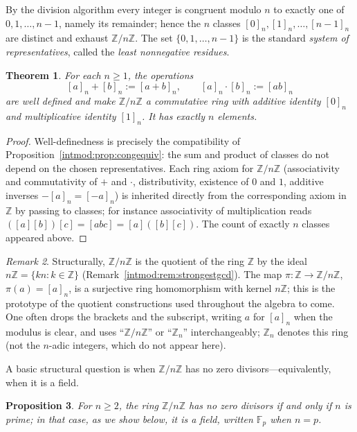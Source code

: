 \documentclass[11pt,a4paper]{article}
\newtheorem{theorem}{Theorem}[section]
\newtheorem{proposition}[theorem]{Proposition}
\theoremstyle{definition}
\theoremstyle{remark}
\newtheorem{remark}[theorem]{Remark}
\newcommand{\Z}{\ensuremath{\mathbb{Z}}}
\newcommand{\Fp}{\ensuremath{\mathbb{F}_{p}}}
\begin{document}
By the division algorithm every integer is congruent modulo \(n\) to exactly one of \(0,1,\dots,n-1\), namely its remainder; hence the \(n\) classes \([0]_n,[1]_n,\dots,[n-1]_n\) are distinct and exhaust \(\Z/n\Z\). The set \(\{0,1,\dots,n-1\}\) is the standard \emph{system of representatives}, called the \emph{least nonnegative residues}.

\begin{theorem}\label{intmod:thm:znring}
For each \(n\ge 1\), the operations
\[
[a]_n + [b]_n := [a+b]_n, \qquad [a]_n\cdot[b]_n := [ab]_n
\]
are well defined and make \(\Z/n\Z\) a commutative ring with additive identity \([0]_n\) and multiplicative identity \([1]_n\). It has exactly \(n\) elements.
\end{theorem}

\begin{proof}
Well-definedness is precisely the compatibility of Proposition~\ref{intmod:prop:congequiv}: the sum and product of classes do not depend on the chosen representatives. Each ring axiom for \(\Z/n\Z\) (associativity and commutativity of \(+\) and \(\cdot\), distributivity, existence of \(0\) and \(1\), additive inverses \(-[a]_n=[-a]_n\)) is inherited directly from the corresponding axiom in \(\Z\) by passing to classes; for instance associativity of multiplication reads \(([a][b])[c]=[abc]=[a]([b][c])\). The count of exactly \(n\) classes appeared above.
\end{proof}

\begin{remark}\label{intmod:rem:quotientring}
Structurally, \(\Z/n\Z\) is the quotient of the ring \(\Z\) by the ideal \(n\Z=\{kn:k\in\Z\}\) (Remark~\ref{intmod:rem:strongestgcd}). The map \(\pi\colon\Z\to\Z/n\Z\), \(\pi(a)=[a]_n\), is a surjective ring homomorphism with kernel \(n\Z\); this is the prototype of the quotient constructions used throughout the algebra to come. One often drops the brackets and the subscript, writing \(a\) for \([a]_n\) when the modulus is clear, and uses ``\(\Z/n\Z\)'' or ``\(\Z_n\)'' interchangeably; \(\Z_n\) denotes this ring (not the \(n\)-adic integers, which do not appear here).
\end{remark}

A basic structural question is when \(\Z/n\Z\) has no zero divisors—equivalently, when it is a field.

\begin{proposition}\label{intmod:prop:zndomain}
For \(n\ge 2\), the ring \(\Z/n\Z\) has no zero divisors if and only if \(n\) is prime; in that case, as we show below, it is a field, written \(\Fp\) when \(n=p\).
\end{proposition}
\end{document}

